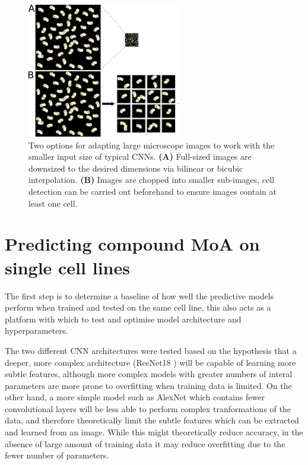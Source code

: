 \documentclass[a4paper,11pt,twoside,openright]{scrbook}
\begin{document}
\begin{figure}
    \includegraphics[width=0.6\textwidth]{ch2ImageChopping}
    \captionsetup{width=0.8\textwidth}
    \caption[Down-sizing and chopping images for CNN training]{Two options for adapting large microscope images to work with the smaller input size of typical CNNs. \textbf{(A)} Full-sized images are downsized to the desired dimensions via bilinear or bicubic interpolation. \textbf{(B)} Images are chopped into smaller sub-images, cell detection can be carried out beforehand to ensure images contain at least one cell.}
    \label{figure:image_chopping}
\end{figure}


\section{Predicting compound MoA on single cell lines}
The first step is to determine a baseline of how well the predictive models perform when trained and tested on the same cell line, this also acts as a platform with which to test and optimise model architecture and hyperparameters.


The two different CNN architectures were tested based on the hypothesis that a deeper, more complex architecture (ResNet18 \cite{resnet_paper}) will be capable of learning more subtle features, although more complex models with greater numbers of interal parameters are more prone to overfitting when training data is limited.
On the other hand, a more simple model such as AlexNet \cite{alexnet_paper} which contains fewer convolutional layers will be less able to perform complex tranformations of the data, and therefore theoretically limit the subtle features which can be extracted and learned from an image.
While this might theoretically reduce accuracy, in the absence of large amount of training data it may reduce overfitting due to the fewer number of parameters.
\end{document}

